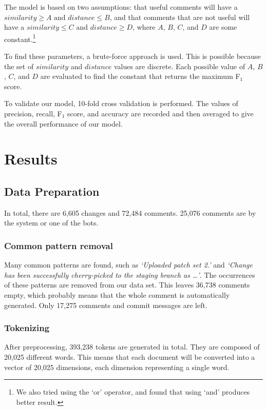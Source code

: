\documentclass[conference]{IEEEtran}
\begin{document}
The model is based on two assumptions: that useful comments will have a $similarity \geq A \text{ and } distance \leq B$,
and that comments that are not useful will have a $ similarity \leq C \text{ and } distance \geq D$,
where $A$, $B$, $C$, and $D$ are some constant.\footnote{We also tried using the `or' operator, and found that using `and' produces better result.}

To find these parameters, a brute-force approach is used.
This is possible because the set of $similarity$ and $distance$ values are discrete.
Each possible value of $A$, $B$, $C$, and $D$ are evaluated to find the constant that returns the maximum F$_1$ score.

To validate our model, 10-fold cross validation is performed.
The values of precision, recall, F$_1$ score, and accuracy are recorded and then averaged
to give the overall performance of our model.


\section{Results}

\subsection{Data Preparation}

In total, there are 6,605 changes and 72,484 comments. 25,076 comments are by the system or one of the bots.

\subsubsection{Common pattern removal}

Many common patterns are found, such as \emph{`Uploaded patch set 2.'} and \emph{`Change has been successfully cherry-picked to the staging branch as \dots'}.
The occurrences of these patterns are removed from our data set.
This leaves 36,738 comments empty, which probably means that the whole comment is automatically generated.
Only 17,275 comments and commit messages are left.

\subsubsection{Tokenizing}

After preprocessing, 393,238 tokens are generated in total. They are composed of 20,025 different words.
This means that each document will be converted into a vector of 20,025 dimensions, each dimension representing a single word.
\end{document}
